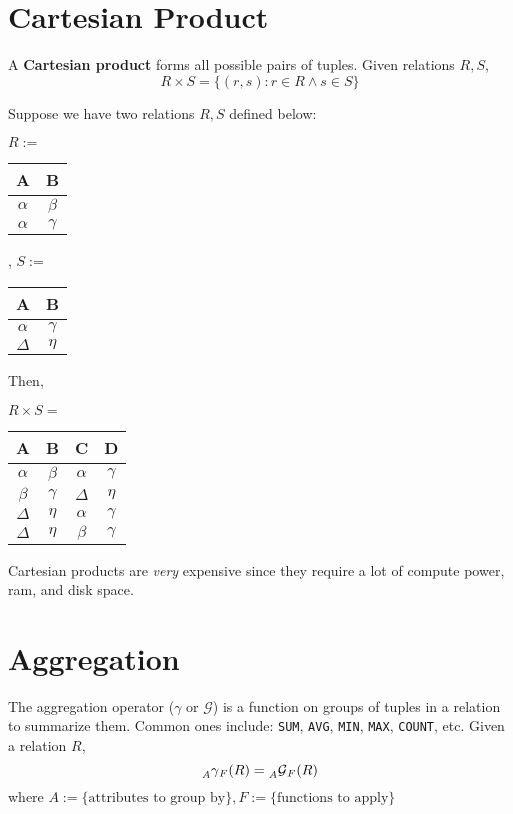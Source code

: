 \documentclass{report}
\newenvironment{definition}[1]{\begin{tcolorbox}[title={Definition: #1}]}{\end{tcolorbox}}
\newenvironment{example}{\begin{tcolorbox}[title={Example},colback=green!5!white,colframe=black!75!green]}{\end{tcolorbox}}
\renewcommand{\bf}[1]{\textbf{{#1}}}
\renewcommand{\tt}[1]{\texttt{{#1}}}
\renewcommand{\it}[1]{\textit{{#1}}}
\begin{document}
\section{Cartesian Product}
\begin{definition}{Cartesian Product}
    A \bf{Cartesian product} forms all possible pairs of tuples. Given relations $R, S$,
    \[R \times S = \{ (r, s) : r \in R \land s \in S \}\]
\end{definition}
\begin{example}
    Suppose we have two relations $R, S$ defined below:
    \begin{center}
        $R :=$
        \begin{tabular}{c|c}
            A & B \\
            \hline
            $\alpha$ & $\beta$ \\
            $\alpha$ & $\gamma$
        \end{tabular}
        , $S :=$
        \begin{tabular}{c|c}
            A & B \\
            \hline
            $\alpha$ & $\gamma$ \\
            $\Delta$ & $\eta$
        \end{tabular}
    \end{center}
    Then, 
    \begin{center}
        $R \times S =$
        \begin{tabular}{c|c|c|c}
            A & B & C & D \\
            \hline
            $\alpha$ & $\beta$ & $\alpha$ & $\gamma$ \\
            $\beta$ & $\gamma$ & $\Delta$ & $\eta$ \\
            $\Delta$ & $\eta$ & $\alpha$ & $\gamma$ \\
            $\Delta$ & $\eta$ & $\beta$ & $\gamma$ \\
        \end{tabular}
    \end{center}
\end{example}
Cartesian products are \it{very} expensive since they require a lot of compute power, ram, and disk
space. 

\section{Aggregation}
\begin{definition}{Aggregation}
    The aggregation operator ($\gamma$ or $\mathcal{G}$) is a function on groups of tuples in a relation
    to summarize them. Common ones include: \tt{SUM}, \tt{AVG}, \tt{MIN}, \tt{MAX}, \tt{COUNT}, etc.
    Given a relation $R$,
    \[
        \prescript{}{\it{A}}{\gamma}_{F}(R) = \prescript{}{\it{A}}{\mathcal{G}}_{F}(R)
    \]
    where $A := \{ \text{attributes to group by} \}, F := \{ \text{functions to apply} \}$
\end{definition}
\end{document}
